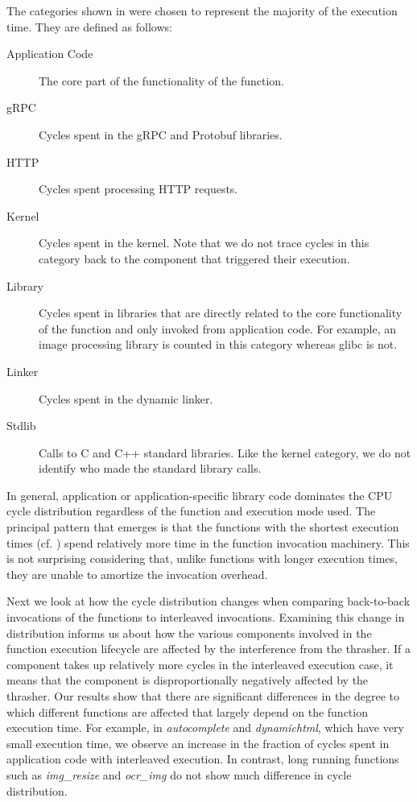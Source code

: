 The categories shown in   were chosen to represent the majority of the execution time. They are defined as follows:
\noindent
\begin{description}
\item[Application Code]  The core part of the functionality of the function.
\item [gRPC] Cycles spent in the gRPC and Protobuf libraries.
\item [HTTP] Cycles spent processing HTTP requests.
\item [Kernel] Cycles spent in the kernel. Note that we do not trace cycles in this category back to the component that triggered their execution.
\item[Library] Cycles spent in libraries that are directly related to the core functionality of the function and only invoked from application code. For example, an image processing library is counted in this category whereas glibc is not.
\item[Linker] Cycles spent in the dynamic linker.
\item[Stdlib] Calls to C and C++ standard libraries. Like the kernel category, we do not identify who made the standard library calls.
  \end{description}

In general, application or application-specific library code dominates the CPU cycle distribution regardless of the function and execution mode used. The principal pattern that emerges is that the functions with the shortest execution times (cf. ) spend relatively more time in the function invocation machinery. This is not surprising considering that, unlike functions with longer execution times, they are unable to amortize the invocation overhead.

Next we look at how the cycle distribution changes when comparing back-to-back invocations of the functions to interleaved invocations. Examining this change in distribution informs us about how the various components involved in the function execution lifecycle are affected by the interference from the thrasher. If a component takes up relatively more cycles in the interleaved execution case, it means that the component is disproportionally negatively affected by the thrasher. Our results show that there are significant differences in the degree to which different functions are affected that largely depend on the function execution time. For example, in \emph{autocomplete} and \emph{dynamichtml}, which have very small execution time, we observe an increase in the fraction of cycles spent in application code with interleaved execution. In contrast, long running functions such as \emph{img\_resize} and \emph{ocr\_img} do not show much difference in cycle distribution.

